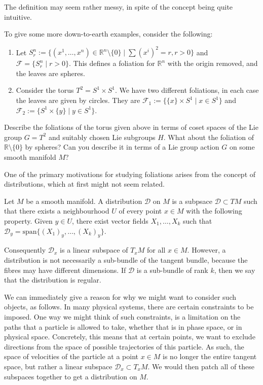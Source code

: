 The definition may seem rather messy, in spite of the concept being quite intuitive. 
\begin{example}
  To give some more down-to-earth examples, consider the following:
  \begin{enumerate}\label{foliations}
    \item Let $S^n_r:=\{(x^1,\dots,x^n)\in\mathbb{R}^n\setminus \{0\}\mid \sum (x^i)^2=r, r>0\}$ and $\mathcal{F}=\{S^n_r\mid r>0\}$. This defines a foliation for $\mathbb{R}^n$ with the origin removed, and the leaves are spheres.
    \item Consider the torus $T^2=S^1\times S^1$. We have two different foliations, in each case the leaves are given by circles. They are $\mathcal{F}_1:=\{\{x\}\times S^1\mid x\in S^1\}$ and $\mathcal{F}_2:=\{S^1\times\{y\}\mid y\in S^1\}$.
  \end{enumerate}
\end{example}
\begin{exercise}
  Describe the foliations of the torus given above in terms of coset spaces of the Lie group $G=T^2$ and suitably chosen Lie subgroups $H$. What about the foliation of $\mathbb{R}\setminus\{0\}$ by spheres? Can you describe it in terms of a Lie group action $G$ on some smooth manifold $M$?
\end{exercise}
One of the primary motivations for studying foliations arises from the concept of distributions, which at first might not seem related.
\begin{definition}
  Let $M$ be a smooth manifold. A distribution $\mathcal{D}$ on $M$ is a subpsace $\mathcal{D}\subset TM$ such that there exists a neighbourhood $U$ of every point $x\in M$ with the following property. Given $y\in U$, there exist vector fields $X_1,\dots,X_k$ such that $\mathcal{D}_y=\text{span}\{(X_1)_y,\dots,(X_k)_y\}$.
\end{definition}
Consequently $\mathcal{D}_x$ is a linear subspace of $T_xM$ for all $x\in M$. However, a distribution is not necessarily a sub-bundle of the tangent bundle, because the fibres may have different dimensions. If $\mathcal{D}$ is a sub-bundle of rank $k$, then we say that the distribution is regular. \par 
We can immediately give a reason for why we might want to consider such objects, as follows. In many physical systems, there are certain constraints to be imposed. One way we might think of such constraints, is a limitation on the paths that a particle is allowed to take, whether that is in phase space, or in physical space. Concretely, this means that at certain points, we want to exclude directions from the space of possible trajectories of this particle. As such, the space of velocities of the particle at a point $x\in M$ is no longer the entire tangent space, but rather a linear subspace $\mathcal{D}_x\subset T_xM$. We would then patch all of these subspaces together to get a distribution on $M$.
